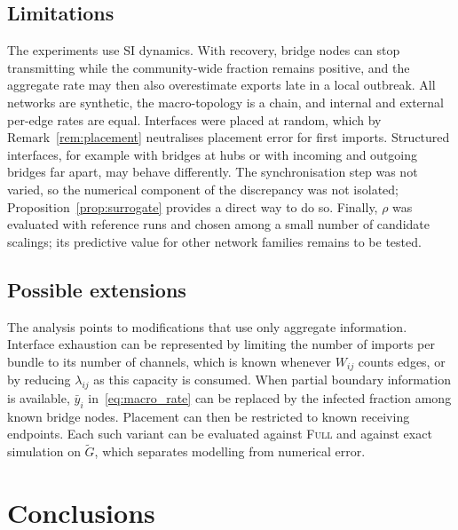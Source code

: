 \documentclass[a4paper,fleqn]{cas-sc}
\newcommand{\ibar}{\bar{y}}
\newcommand{\Full}{\textup{\textsc{Full}}}
\begin{document}
\subsection{Limitations}

The experiments use SI dynamics. With recovery, bridge nodes can stop transmitting while the community-wide fraction remains positive, and the aggregate rate may then also overestimate exports late in a local outbreak. All networks are synthetic, the macro-topology is a chain, and internal and external per-edge rates are equal. Interfaces were placed at random, which by Remark~\ref{rem:placement} neutralises placement error for first imports. Structured interfaces, for example with bridges at hubs or with incoming and outgoing bridges far apart, may behave differently. The synchronisation step was not varied, so the numerical component of the discrepancy was not isolated; Proposition~\ref{prop:surrogate} provides a direct way to do so. Finally, $\rho$ was evaluated with reference runs and chosen among a small number of candidate scalings; its predictive value for other network families remains to be tested.

\subsection{Possible extensions}

The analysis points to modifications that use only aggregate information. Interface exhaustion can be represented by limiting the number of imports per bundle to its number of channels, which is known whenever $W_{ij}$ counts edges, or by reducing $\lambda_{ij}$ as this capacity is consumed. When partial boundary information is available, $\ibar_i$ in~\eqref{eq:macro_rate} can be replaced by the infected fraction among known bridge nodes. Placement can then be restricted to known receiving endpoints. Each such variant can be evaluated against \Full{} and against exact simulation on $\tilde G$, which separates modelling from numerical error.

\section{Conclusions}
\label{sec:conclusions}
\end{document}
